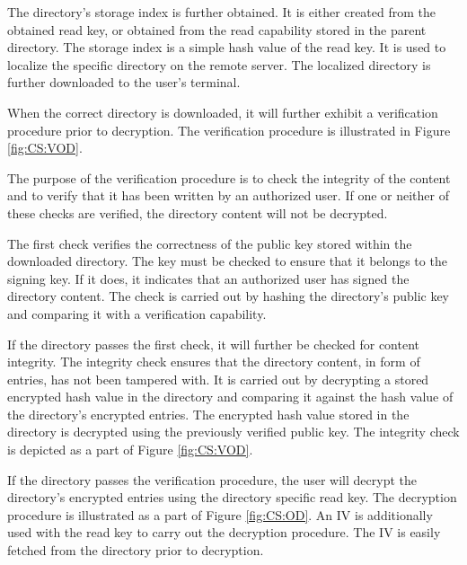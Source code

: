 \documentclass[pdftex,english,10pt,b5paper,twoside]{book}
\begin{document}
The directory's storage index is further obtained. It is either created from the
obtained read key, or obtained from the read capability stored in the parent
directory. The storage index is a simple hash value of the read key. It is used to
localize the specific directory on the remote server. The localized directory is
further downloaded to the user's terminal.

When the correct directory is downloaded, it will further exhibit a verification
procedure prior to decryption. The verification procedure is illustrated in
Figure \ref{fig:CS:VOD}.

The purpose of the verification procedure is to check the integrity of the
content and to verify that it has been written by an authorized user.
If one or neither of these checks are verified, the directory content will not
be decrypted.

The first check verifies the correctness of the public key stored within the
downloaded directory. The key must be checked to ensure that it belongs to the signing
key. If it does, it indicates that an authorized user has signed the directory
content. The check is carried out by hashing the directory's public key and
comparing it with a verification capability.

If the directory passes the first check, it will further be checked for content
integrity. The integrity check ensures that the directory content, in form of
entries, has not been tampered with. It is carried out by decrypting a stored
encrypted hash value in the directory and comparing it against the hash value of
the directory's encrypted entries. The encrypted hash value stored in the
directory is decrypted using the previously verified public key. The integrity
check is depicted as a part of Figure \ref{fig:CS:VOD}.

If the directory passes the verification procedure, the user will decrypt the
directory's encrypted entries using the directory specific read key. The decryption procedure
is illustrated as a part of Figure \ref{fig:CS:OD}. An \ac{IV} is additionally
used with the read key to carry out the decryption procedure. The \ac{IV} is easily
fetched from the directory prior to decryption.
\end{document}
